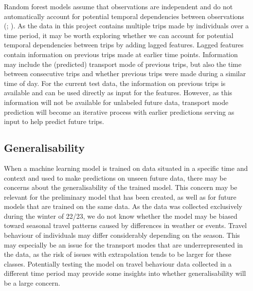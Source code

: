 \documentclass[10pt, a4paper, titlepage, hidelinks]{article}
\begin{document}
Random forest models assume that observations are independent and do not automatically account for potential temporal dependencies between observations (\cite{hu&szymczak2023}; \cite{sela&simonoff2020}). As the data in this project contains multiple trips made by individuals over a time period, it may be worth exploring whether we can account for potential temporal dependencies between trips by adding lagged features. Lagged features contain information on previous trips made at earlier time points. Information may include the (predicted) transport mode of previous trips, but also the time between consecutive trips and whether previous trips were made during a similar time of day. For the current test data, the information on previous trips is available and can be used directly as input for the features. However, as this information will not be available for unlabeled future data, transport mode prediction will become an iterative process with earlier predictions serving as input to help predict future trips.

\subsection{Generalisability}

When a machine learning model is trained on data situated in a specific time and context and used to make predictions on unseen future data, there may be concerns about the generalisability of the trained model. This concern may be relevant for the preliminary model that has been created, as well as for future models that are trained on the same data. As the data was collected exclusively during the winter of 22/23, we do not know whether the model may be biased toward seasonal travel patterns caused by differences in weather or events. Travel behaviour of individuals may differ considerably depending on the season. This may especially be an issue for the transport modes that are underrepresented in the data, as the risk of issues with extrapolation tends to be larger for these classes. Potentially testing the model on travel behaviour data collected in a different time period may provide some insights into whether generalisability will be a large concern.

\newpage


\printbibliography[title = {References}]
\end{document}
